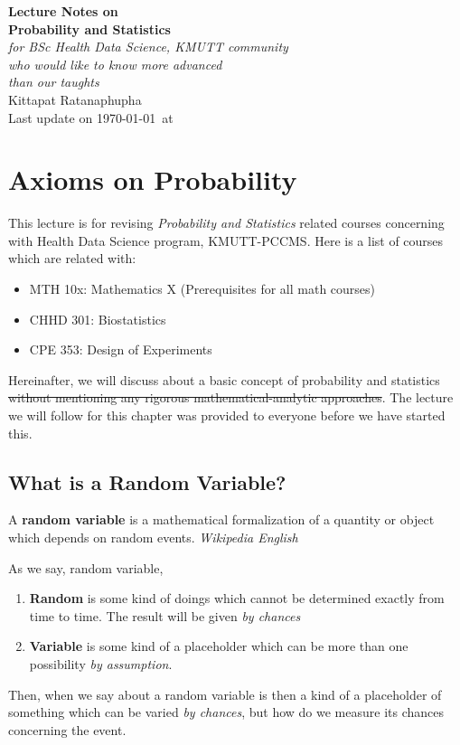 \documentclass[12pt, a4paper]{report}
\begin{document}
\begin{titlepage}
    \begin{center}
        \null\vfill
        \textbf{\Large Lecture Notes on\\[6pt]
        Probability and Statistics}\\[6pt]
        \emph{for BSc Health Data Science, KMUTT community\\
        who would like to know more advanced\\
        than our taughts}\\[12pt]

        Kittapat Ratanaphupha\\
        Last update on \today\, at \currenttime
        \vfill
    \end{center}
\end{titlepage}
\dominitoc
\nomtcrule
\tableofcontents
    \chapter{Axioms on Probability}
    \vspace{-3em}
    \minitoc[n]
    This lecture is for revising \emph{Probability and Statistics} related courses concerning with Health Data Science program, KMUTT-PCCMS. Here is a list of courses which are related with:
    \begin{itemize}
        \item MTH 10x: Mathematics X (Prerequisites for all math courses)
        \item CHHD 301: Biostatistics
        \item CPE 353: Design of Experiments
    \end{itemize}

    Hereinafter, we will discuss about a basic concept of probability and statistics \st{without mentioning any rigorous mathematical-analytic approaches}. The lecture we will follow for this chapter was provided to everyone before we have started this.

    \section{What is a Random Variable?}
    \begin{displayquote}
        A \textbf{random variable} is a mathematical formalization of a quantity or object which depends on random events. \textemdash \emph{Wikipedia English}
    \end{displayquote}
    As we say, random variable,
    \begin{enumerate}
        \item \textbf{Random} is some kind of doings which cannot be determined exactly from time to time. The result will be given \emph{by chances}
        \item \textbf{Variable} is some kind of a placeholder which can be more than one possibility \emph{by assumption}.
    \end{enumerate}
    Then, when we say about a random variable is then a kind of a placeholder of something which can be varied \emph{by chances}, but how do we measure its chances concerning the event.
\end{document}
